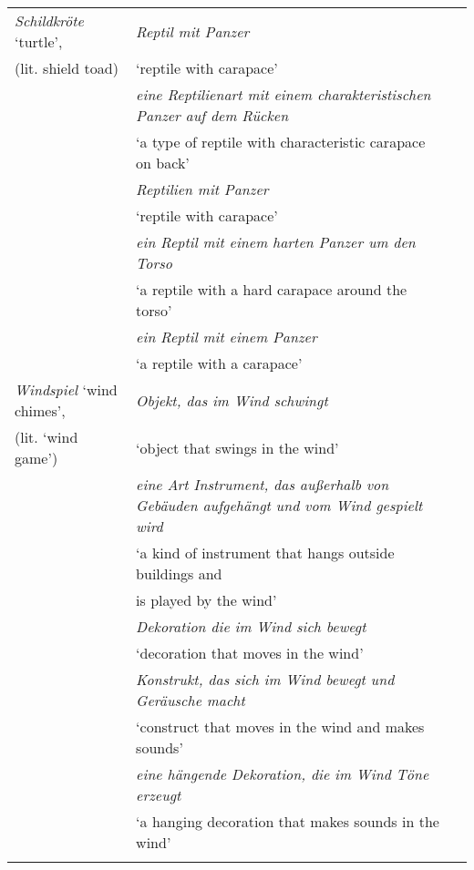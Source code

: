 \documentclass[output=paper,colorlinks,citecolor=brown]{langscibook}
\begin{document}
\begin{table}
\begin{tabularx}{\textwidth}{p{4cm}p{7.5cm}l}
\textit{Schildkröte} `turtle',  &	\textit{Reptil mit Panzer}\\
\hspace*{+3mm}(lit. shield toad) & \hspace*{+3mm}`reptile with carapace'\\
& \textit{eine Reptilienart mit einem charakteristischen Panzer auf dem Rücken}\\
& \hspace*{+3mm}`a type of reptile with characteristic carapace on back'\\
&	\textit{Reptilien mit Panzer}\\
& \hspace*{+3mm}`reptile with carapace'\\
&	\textit{ein Reptil mit einem harten Panzer um den Torso}\\
& \hspace*{+3mm}`a reptile with a hard carapace around the torso'\\
&	\textit{ein Reptil mit einem Panzer}\\
& \hspace*{+3mm}`a reptile with a carapace'\\
\midrule

\textit{Windspiel} `wind chimes',  &	\textit{Objekt, das im Wind schwingt}\\
\hspace*{+3mm}(lit. `wind game') &	\hspace*{+3mm}`object that swings in the wind'\\
& \textit{eine Art Instrument, das außerhalb von Gebäuden aufgehängt und vom Wind gespielt wird}\\
& \hspace*{+3mm}`a kind of instrument that hangs outside buildings and\\
& \hspace*{+4mm}is played by the wind'\\
& \textit{Dekoration die im Wind sich bewegt}\\
& \hspace*{+3mm}`decoration that moves in the wind'\\
&	\textit{Konstrukt, das sich im Wind bewegt und Geräusche macht}\\
& \hspace*{+3mm}`construct that moves in the wind and makes sounds'\\
&	\textit{eine hängende Dekoration, die im Wind Töne erzeugt}\\
& \hspace*{+3mm}`a hanging decoration that makes sounds in the wind'\\

  \lspbottomrule
  \end{tabularx}
\end{table}
\end{document}
